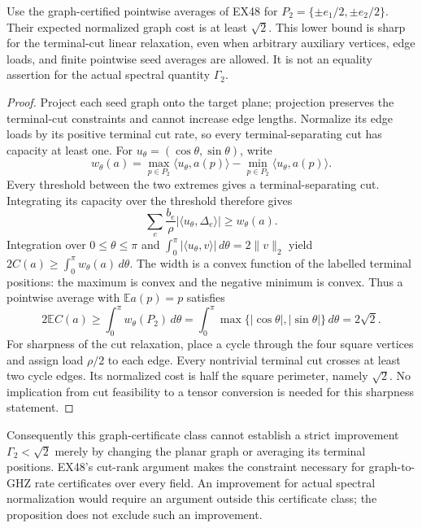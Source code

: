 \begin{proposition}
\label{rt:square-graph-seed}
Use the graph-certified pointwise averages of EX48 for
$P_2=\{\pm e_1/2,\pm e_2/2\}$. Their expected normalized
graph cost is at least $\sqrt2$. This lower bound is sharp for
the terminal-cut linear relaxation, even when arbitrary auxiliary
vertices, edge loads, and finite pointwise seed averages are allowed.
It is not an equality assertion for the actual spectral quantity
$\Gamma_2$.
\end{proposition}
\begin{proof}
Project each seed graph onto the target plane; projection preserves
the terminal-cut constraints and cannot increase edge lengths.
Normalize its edge loads by its positive terminal cut rate, so
every terminal-separating cut has capacity at least one. For
$u_\theta=(\cos\theta,\sin\theta)$, write
\[
 w_\theta(a)=\max_{p\in P_2}\langle u_\theta,a(p)\rangle
             -\min_{p\in P_2}\langle u_\theta,a(p)\rangle.
\]
Every threshold between the two extremes gives a terminal-separating
cut. Integrating its capacity over the threshold therefore gives
\[
 \sum_e\frac{b_e}{\rho}
       |\langle u_\theta,\Delta_e\rangle|
 \geq w_\theta(a).
\]
Integration over $0\leq\theta\leq\pi$ and
$\int_0^\pi|\langle u_\theta,v\rangle|\,d\theta=2\|v\|_2$
yield $2C(a)\geq\int_0^\pi w_\theta(a)\,d\theta$.
The width is a convex function of the labelled terminal positions:
the maximum is convex and the negative minimum is convex.
Thus a pointwise average with $\mathbb E a(p)=p$ satisfies
\[
 2\mathbb E C(a)\geq
 \int_0^\pi w_\theta(P_2)\,d\theta
 =\int_0^\pi\max\{|\cos\theta|,|\sin\theta|\}\,d\theta
 =2\sqrt2.
\]
For sharpness of the cut relaxation, place a cycle through the
four square vertices and assign load $\rho/2$ to each edge.
Every nontrivial terminal cut crosses at least two cycle edges.
Its normalized cost is half the square perimeter, namely
$\sqrt2$. No implication from cut feasibility to a tensor
conversion is needed for this sharpness statement.
\end{proof}

Consequently this graph-certificate class cannot establish a strict
improvement $\Gamma_2<\sqrt2$ merely by changing the planar graph
or averaging its terminal positions. EX48's cut-rank argument makes
the constraint necessary for graph-to-GHZ rate certificates over
every field. An improvement for actual spectral normalization would
require an argument outside this certificate class; the proposition
does not exclude such an improvement.
